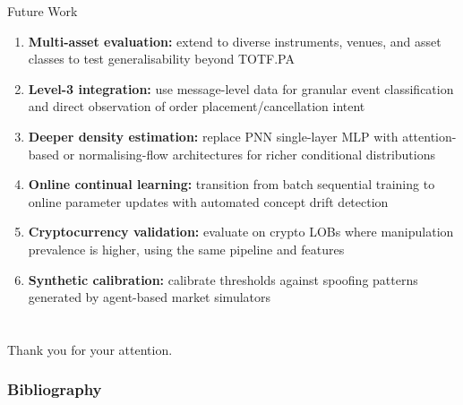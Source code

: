 \documentclass{beamer}
\begin{document}
\begin{frame}{Future Work}
    \begin{enumerate}
        \item \textbf{Multi-asset evaluation:} extend to diverse instruments, venues, and asset classes to test generalisability beyond TOTF.PA
        \item \textbf{Level-3 integration:} use message-level data for granular event classification and direct observation of order placement/cancellation intent
        \item \textbf{Deeper density estimation:} replace PNN single-layer MLP with attention-based or normalising-flow architectures for richer conditional distributions
        \item \textbf{Online continual learning:} transition from batch sequential training to online parameter updates with automated concept drift detection
        \item \textbf{Cryptocurrency validation:} evaluate on crypto LOBs where manipulation prevalence is higher, using the same pipeline and features
        \item \textbf{Synthetic calibration:} calibrate thresholds against spoofing patterns generated by agent-based market simulators
    \end{enumerate}
\end{frame}


\section*{}
\begin{frame}{}
    \centering
    \LARGE{Thank you for your attention.}
\end{frame}


\begin{frame}[allowframebreaks]
    \frametitle{Bibliography}
    \nocite{*}
    \printbibliography
\end{frame}
\end{document}
